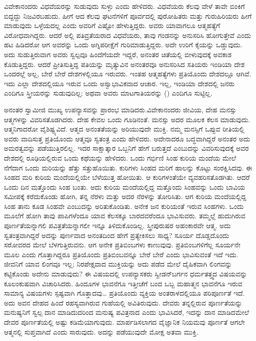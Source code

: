  ವಿವೇಕಾನಂದರು ವಿಧವೆಯರನ್ನು ಸುಡುವುದು ಸುಳ್ಳು ಎಂದು ಹೇಳಿದರು. ವಿಧವೆಯರು ಕೆಲವು ವೇಳೆ ತಾವೇ ಬಿಂಕಿಗೆ ಬಿದ್ದದ್ದು ನಿಜವಿರಬಹುದು. ಹೀಗೆ ಆದ ಕೆಲವು ಘಟನೆಗಳಿಗೆ ಪೂರ್ವದಲ್ಲಿ ಪುರೋಹಿತರು ಮತ್ತು ಗುರುಹಿರಿಯರು ಹೀಗೆ ಮಾಡುವುದು ಒಳ್ಳೆಯದಲ್ಲ ಎಂದು ಅವರಿಗೆ ಎಷ್ಟೋ ಹೇಳುತ್ತಿದ್ದರು. ಅವರು ಯಾವಾಗಲೂ ಆತ್ಮಹತ್ಯೆಗೆ ವಿರೋಧವಾಗಿದ್ದರು. ಆದರೆ ಅಲ್ಲಿ ಪತಿವ್ರತೆಯರಾದ ವಿಧವೆಯರು, ತಾವು ಗಂಡನನ್ನು ಅನುಸರಿಸಿ ಹೋಗುತ್ತೇವೆ ಎಂದು ಹಟ ಹಿಡಿದರೋ ಆಗ ಅವರನ್ನು ಒಂದು ಅಗ್ನಿಪರೀಕ್ಷೆಗೆ ಗುರಿಮಾಡುತ್ತಿದ್ದರು. ಅದೇ ಉರಿಗೆ ಕೈಯನ್ನು ಒಡ್ಡುವುದು. ಅದು ಸುಡುತ್ತಿರುವಾಗ ಅವರು ಸ್ವಲ್ಪವೂ ಹಿಂದೆಗೆಯದೇ ಇದ್ದರೆ, ಅನಂತರ ಚಿತೆಯಲ್ಲಿ ಬೀಳುವುದಕ್ಕೆ ಅವಕಾಶ ಕೊಡುತ್ತಿದ್ದರು. ಆದರೆ ಪ್ರೀತಿಸುತ್ತಿದ್ದ ಪತಿಯನ್ನು ಮೃತ್ಯುವಿನ ಅನಂತರವೂ ಅನುಸರಿಸಿದ ಸತಿಯರು ಇಂಡಿಯಾ ದೇಶ ಒಂದರಲ್ಲೆ ಅಲ್ಲ, ಬೇರೆ ಬೇರೆ ದೇಶಗಳಲ್ಲಿಯೂ ಇರುವರು. ಇಂತಹ ಆತ್ಮಹತ್ಯೆಗಳು ಪ್ರತಿಯೊಂದು ದೇಶದಲ್ಲೂ ಆಗಿವೆ. ಇದು ಎಲ್ಲಾ ದೇಶದಲ್ಲಿಯೂ ಇರುವ ಒಂದು ಅಸ್ವಾಭಾವಿಕವಾದ ಆಚಾರ. ಇಲ್ಲ, ಇಂಡಿಯಾ ದೇಶದಲ್ಲಿ ಜನರು ಎಂದಿಗೂ ಸ್ತ್ರೀಯರನ್ನು ಸುಡುವುದಿಲ್ಲ; ಅಥವಾ ಅವರು ಮಾಟಗಾತಿಯರನ್ನು () ಎಂದಿಗೂ ಸುಟ್ಟಿಲ್ಲ. 

 ಅನಂತರ ಸ್ವಾಮೀಜಿ ಮುಖ್ಯ ಉಪನ್ಯಾಸವನ್ನು ಪ್ರಾರಂಭ ಮಾಡಿದರು.\break ವಿವೇಕಾನಂದರು ಜೀವಿಯ, ದೇಹ ಮನಸ್ಸು ಆತ್ಮಗಳನ್ನು ವಿವರಿಸತೊಡಗಿದರು. ದೇಹ ಕೇವಲ ಒಂದು ಗೂಡಿನಂತೆ. ಮನಸ್ಸು ಅದರ ಮೂಲಕ ಕೆಲಸ ಮಾಡುವುದು. ಆತ್ಮನಿಗಾದರೋ ವೈಶಿಷ್ಟ್ಯವಿದೆ. ಆತ್ಮದ ಅನಂತತೆಯನ್ನು ಅರಿಯುವುದೇ ಮುಕ್ತಿ. ನಮ್ಮ ಮನಸ್ಸಿಗೆ ಒಪ್ಪುವ ರೀತಿಯಲ್ಲಿ ಅವರು ವಾದಿಸುತ್ತ ಪ್ರತಿಯೊಂದು ಆತ್ಮವೂ ಸ್ವತಂತ್ರ ಎಂದು ಹೇಳಿದರು. ಅದೇನಾದರೂ ಬದ್ಧವಾಗಿದ್ದರೆ ಅನಂತರ ಅದು ಅಮರತ್ವವನ್ನು ಪಡೆಯುತ್ತಿರಲಿಲ್ಲ. ಇದರ ಸಾಕ್ಷಾತ್ಕಾರ ಒಬ್ಬನಿಗೆ ಹೇಗೆ ಬರುತ್ತದೆ ಎಂಬುದನ್ನು ವಿವರಿಸುವುದಕ್ಕೆ ಅವರ ದೇಶದಲ್ಲಿ ರೂಢಿಯಲ್ಲಿರುವ ಒಂದು ಕಥೆಯನ್ನು ಹೇಳಿದರು. ಒಂದು ಗರ್ಭಿಣಿ ಸಿಂಹ ಕುರಿಯ ಮಂದೆಯ ಮೇಲೆ ನೆಗೆದಾಗ ಒಂದು ಮರಿಯನ್ನು ಹೆತ್ತು ಸತ್ತುಹೊಯಿತು. ಕುರಿಗಳು ಸಿಂಹದ ಮರಿಗೆ ಹಾಲನ್ನು ಕೊಟ್ಟು ಸಂರಕ್ಷಿಸಿದವು. ಈ ಸಿಂಹದ ಮರಿ ಕುರಿಯ ಮಂದೆಯಲ್ಲಿಯೇ ಬೆಳೆಯುತ್ತ ಹೋಯಿತು. ಆ ಕುರಿಗಳಂತೆಯೇ ವ್ಯವಹರಿಸತೊಡಗಿತು. ಆದರೆ ಒಂದು ದಿನ ಮತ್ತೊಂದು ಸಿಂಹ ಬಂತು. ಅದು ಕುರಿಯ ಮಂದೆಯಲ್ಲಿದ್ದ ಮತ್ತೊಂದು ಸಿಂಹವನ್ನು ಒಂದು ಬಾವಿಯ ಸಮೀಪಕ್ಕೆ ಕರೆದುಕೊಂಡು ಹೋಗಿ, ತನ್ನ ನೆರಳು ಮತ್ತು ಅದರ ನೆರಳನ್ನು ತೋರಿಸಿತು. ಆಗ ಕುರಿಯ ಮಂದೆಯಲ್ಲಿದ್ದ ಸಿಂಹ ತಾನು ಕೂಡ ಸಿಂಹವೇ ಎಂಬುದನ್ನು ಅರಿತುಕೊಂಡಿತು. ಅನೇಕ ಜನ ಕುರಿಯಂತೆ ಇರುವ ಸಿಂಹಗಳು. ಒಂದು ಮೂಲೆಗೆ ಹೋಗಿ ತಾವು ಪಾಪಿಗಳೆಂದೂ ಯಾವ ಕೆಲಸಕ್ಕೂ ಬಾರದವರೆಂದೂ ಭಾವಿಸುವರು. ತಮ್ಮಲ್ಲೆ ಹುದುಗಿರುವ ಪೂರ್ಣತೆಯನ್ನಾಗಲಿ ಪವಿತ್ರತೆಯನ್ನಾಗಲೀ ಇನ್ನೂ ತಿಳಿದುಕೊಂಡಿಲ್ಲ. ಸ್ತ್ರೀಪುರುಷರ ಅಹಂಕಾರವೇ ಆತ್ಮ. ಅದು ಸ್ವತಂತ್ರವಾಗಿದ್ದರೆ ಅದನ್ನು ಪುರ್ಣವಾದ ಅನಂತದಿಂದ ಹೇಗೆ ಪ್ರತ್ಯೇಕಿಸಲು ಸಾಧ್ಯ? ಸೂರ್ಯ ದೊಡ್ಡದೊಂದು ಸರೋವರದ ಮೇಲೆ ಬೆಳಗುತ್ತಿರುವನು. ಆಗ ಅನೇಕ ಪ್ರತಿಬಿಂಬಗಳು ಕಾಣುವುವು. ಪ್ರತಿಬಿಂಬಗಳಿಗೆಲ್ಲ ಸೂರ್ಯನೇ ಮೂಲ ಎಂದು ಗೊತ್ತಾಗಿದ್ದರೂ ಪ್ರತಿಯೊಂದು ಪ್ರತಿಬಿಂಬವನ್ನೂ ಬೇರೆ ಬೇರೆ ಎಂದು ಭಾವಿಸುವಂತೆ ಇದೆ ಇದು. ಜೀವನಿಗೆ ಯಾವ ಲಿಂಗವೂ ಇಲ್ಲ; ನಿರಪೇಕ್ಷವಾದ ಮುಕ್ತಿಯನ್ನು ಅದು ಪಡೆದ ಮೇಲೆ ದೈಹಿಕವಾಗಿ ಲಿಂಗವನ್ನು ಕಟ್ಟಿಕೊಂಡು ಅದೇನು ಮಾಡುವುದು? ಈ ವಿಷಯದಲ್ಲಿ ಉಪನ್ಯಾಸಕರು ಸ್ವೀಡನ್‍ಬರ್ಗನ ಧರ್ಮತತ್ತ್ವದ ವಿಷಯವನ್ನು ಕೂಲಂಕುಷವಾಗಿ ವಿಚಾರಿಸಿದರು. ಹಿಂದೂಗಳ ಭಾವನೆಗೂ ಇತ್ತೀಚೆಗೆ ಬಂದ ಒಬ್ಬ ಮಹಾತ್ಮನ ಭಾವನೆಗೂ ಇರುವ ಸಾಮಾನ್ಯ ವಿಷಯಗಳು ಸ್ಪಷ್ಟವಾಗಿ ಗೊತ್ತಾದವು… ಪ್ರತಿಯೊಂದು ವ್ಯಕ್ತಿಯ ಅಂತರಾಳದಲ್ಲಿಯೂ ಪರಿಪೂರ್ಣತೆ ಇದೆ. ಅದು ಅವನ ದೇಹದ ಹಿಂದೆ ರಹಸ್ಯವಾಗಿರುವ ಗುಹೆಯಲ್ಲಿ ಅವಿತಿರುವುದು. ದೇವರು ತನ್ನಲ್ಲಿರುವ ಪೂರ್ಣತೆಯನ್ನು ಮನುಷ್ಯನಿಗೆ ಸ್ವಲ್ಪ ದಾನ ಮಾಡಿದುದರಿಂದ ಮನುಷ್ಯ ಪವಿತ್ರನಾದ ಎಂದು ಭಾವಿಸಿದರೆ, ಇದನ್ನು ದಾನ ಮಾಡಿದಮೇಲೆ ದೇವರ ಪೂರ್ಣತೆಯಲ್ಲಿ ಅಷ್ಟು ಕಡಿಮೆಯಾಗುವುದು. ಮಾರ್ಪಡಿಸಲಾಗದ ವೈಜ್ಞಾನಿಕ ನಿಯಮವು ಪೂರ್ಣತೆ ಆಗಲೇ ಆತ್ಮನಲ್ಲಿ ಸುಪ್ತವಾಗಿದೆ ಎಂದು ಸಾರುವುದು. ಅದನ್ನು ಪಡೆಯುವುದೇ ಮೋಕ್ಷ ಅತವಾ ಮುಕ್ತಿ. 

